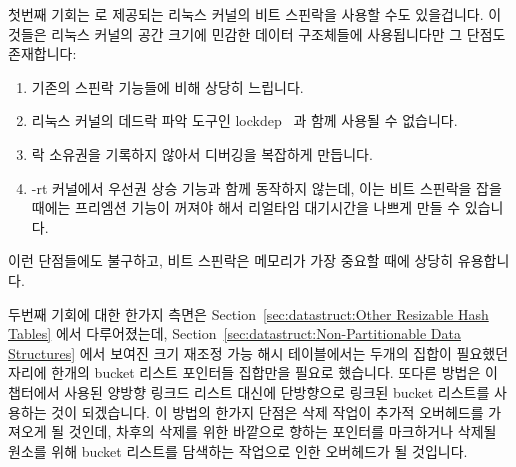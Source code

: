 첫번째 기회는  로 제공되는 리눅스 커널의
비트 스핀락을 사용할 수도 있을겁니다.
이것들은 리눅스 커널의 공간 크기에 민감한 데이터 구조체들에 사용됩니다만 그
단점도 존재합니다:

\begin{enumerate}
\item	기존의 스핀락 기능들에 비해 상당히 느립니다.
\item	리눅스 커널의 데드락 파악 도구인
	lockdep~\cite{JonathanCorbet2006lockdep} 과 함께 사용될 수 없습니다.
\item	락 소유권을 기록하지 않아서 디버깅을 복잡하게 만듭니다.
\item	-rt 커널에서 우선권 상승 기능과 함께 동작하지 않는데, 이는 비트
	스핀락을 잡을 때에는 프리엠션 기능이 꺼져야 해서 리얼타임 대기시간을
	나쁘게 만들 수 있습니다.

\end{enumerate}

이런 단점들에도 불구하고, 비트 스핀락은 메모리가 가장 중요할 때에 상당히
유용합니다.

두번째 기회에 대한 한가지 측면은
Section~\ref{sec:datastruct:Other Resizable Hash Tables} 에서 다루어졌는데,
Section~\ref{sec:datastruct:Non-Partitionable Data Structures} 에서 보여진 크기
재조정 가능 해시 테이블에서는 두개의 집합이 필요했던 자리에 한개의 bucket
리스트 포인터들 집합만을 필요로 했습니다.
또다른 방법은 이 챕터에서 사용된 양방향 링크드 리스트 대신에 단방향으로 링크된
bucket 리스트를 사용하는 것이 되겠습니다.
이 방법의 한가지 단점은 삭제 작업이 추가적 오버헤드를 가져오게 될 것인데,
차후의 삭제를 위한 바깥으로 향하는 포인터를 마크하거나 삭제될 원소를 위해
bucket 리스트를 담색하는 작업으로 인한 오버헤드가 될 것입니다.
\iffalse

